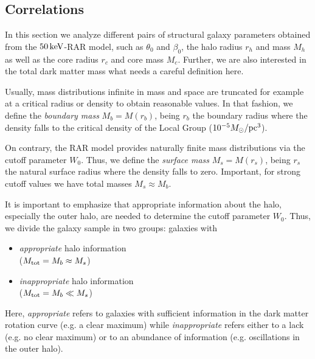\subsection{Correlations}
In this section we analyze different pairs of structural galaxy parameters obtained from the $50\,{\rm keV}$-RAR model, such as $\theta_0$ and $\beta_0$, the halo radius $r_h$ and mass $M_h$ as well as the core radius $r_c$ and core mass $M_c$. Further, we are also interested in the total dark matter mass what needs a careful definition here.

Usually, mass distributions infinite in mass and space are truncated for example at a critical radius or density to obtain reasonable values. In that fashion, we define the \textit{boundary mass} $M_b = M(r_b)$, being $r_b$ the boundary radius where the density falls to the critical density of the Local Group ($10^{-5} M_\odot/{\rm pc}^3$).

On contrary, the RAR model provides naturally finite mass distributions via the cutoff parameter $W_0$. Thus, we define the \textit{surface mass} $M_s = M(r_s)$, being $r_s$ the natural surface radius where the density falls to zero. Important, for strong cutoff values we have total masses $M_s \approx M_b$. 

It is important to emphasize that appropriate information about the halo, especially the outer halo, are needed to determine the cutoff parameter $W_0$. Thus, we divide the galaxy sample in two groups: galaxies with \begin{itemize}
\item \textit{appropriate} halo information\\($M_{\rm tot} = M_b \approx M_s$) 
\item \textit{inappropriate} halo information\\($M_{\rm tot} = M_b \ll M_s$)
\end{itemize} Here, \textit{appropriate} refers to galaxies with sufficient information in the dark matter rotation curve (e.g. a clear maximum) while \textit{inappropriate} refers either to a lack (e.g. no clear maximum) or to an abundance of information (e.g. oscillations in the outer halo).

